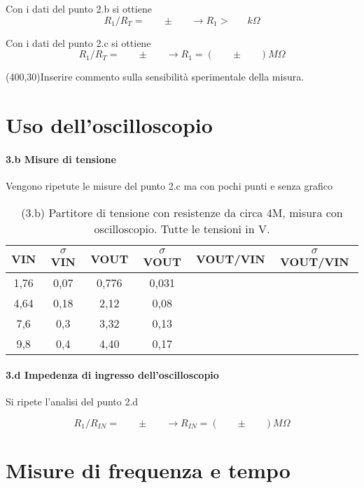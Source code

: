 \documentclass[10pt,a4paper]{article}
\newcommand{\exn}{\phantom{xxx}}
\begin{document}
Con i dati del punto 2.b si ottiene
\[ R_1/R_T = \exn  \pm  \exn   \rightarrow  R_1 > \exn k\Omega
\]


Con i dati del punto 2.c si ottiene
\[ R_1/R_T = \exn  \pm  \exn   \rightarrow  R_1 = (\exn \pm  \exn)  M\Omega
\]


\framebox(400,30){Inserire commento sulla sensibilit\`a sperimentale della misura.} 


\section{Uso dell'oscilloscopio}

\paragraph{3.b Misure di tensione} 
Vengono ripetute le misure del punto 2.c  ma con pochi punti e senza grafico
\begin{table}[h]
\centering
\begin{tabular}{|c|c|c|c|c|c|}
\hline 
VIN& $\sigma$ VIN  &VOUT	 & $\sigma$ VOUT& VOUT/VIN & $\sigma$ VOUT/VIN \\
\hline 
1,76 & 0,07 & 0,776 & 0,031 & \exn &\exn \\
4,64 & 0,18 & 2,12 & 0,08 & \exn &\exn \\
7,6 & 0,3 & 3,32 & 0,13 & \exn &\exn \\
9,8 & 0,4 & 4,40 & 0,17 & \exn &\exn \\
\hline 
\end{tabular} 
\caption{(3.b) Partitore di tensione con resistenze da circa 4M, misura con oscilloscopio. Tutte le tensioni in V.}
\end{table}


\paragraph{3.d Impedenza di ingresso dell'oscilloscopio} Si ripete l'analisi del punto 2.d

\[ R_1/R_{IN} = \exn  \pm  \exn   \rightarrow  R_{IN} = (\exn \pm  \exn)  M\Omega
\]


\section{Misure di frequenza e tempo}
\end{document}
